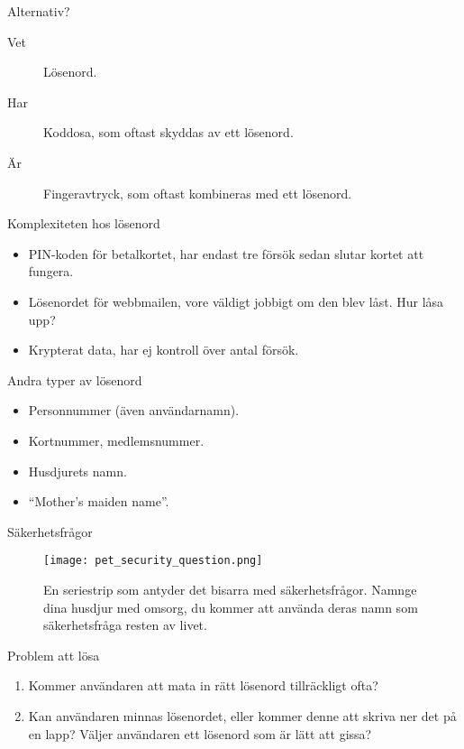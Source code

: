 \documentclass{beamer}
\begin{document}
\begin{frame}{\insertsubsectionhead}{Alternativ?}
  \begin{description}
    \item[Vet] Lösenord.
    \item[Har] Koddosa, som oftast skyddas av ett lösenord.
    \item[Är] Fingeravtryck, som oftast kombineras med ett lösenord.
  \end{description}
\end{frame}

\begin{frame}{\insertsubsectionhead}{Komplexiteten hos lösenord}
  \begin{itemize}
    \item PIN-koden för betalkortet, har endast tre försök sedan slutar kortet 
      att fungera.

    \item Lösenordet för webbmailen, vore väldigt jobbigt om den blev låst.
      Hur låsa upp?

    \item Krypterat data, har ej kontroll över antal försök.

  \end{itemize}
\end{frame}

\begin{frame}{\insertsubsectionhead}{Andra typer av lösenord}
  \begin{itemize}
    \item Personnummer (även användarnamn).
    \item Kortnummer, medlemsnummer.
    \item Husdjurets namn.
    \item \enquote{Mother's maiden name}.
  \end{itemize}
\end{frame}

\begin{frame}{\insertsubsectionhead}{Säkerhetsfrågor}
  \begin{figure}
    \texttt{[image: pet\_security\_question.png]}
    \caption{En seriestrip som antyder det bisarra med säkerhetsfrågor.
    Namnge dina husdjur med omsorg, du kommer att använda deras namn som 
    säkerhetsfråga resten av livet.}
  \end{figure}
\end{frame}

\begin{frame}{\insertsubsectionhead}{Problem att lösa}
  \begin{enumerate}
    \item Kommer användaren att mata in rätt lösenord tillräckligt ofta?

    \item Kan användaren minnas lösenordet, eller kommer denne att skriva ner 
      det på en lapp?
      Väljer användaren ett lösenord som är lätt att gissa?

  \end{enumerate}
\end{frame}
\end{document}
